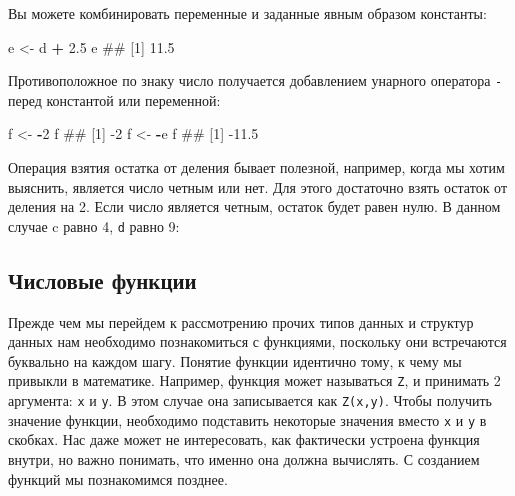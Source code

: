 \documentclass[]{book}
\newenvironment{Shaded}{\begin{snugshade}}{\end{snugshade}}
\newcommand{\DecValTok}[1]{\textcolor[rgb]{0.00,0.00,0.81}{#1}}
\newcommand{\FloatTok}[1]{\textcolor[rgb]{0.00,0.00,0.81}{#1}}
\newcommand{\StringTok}[1]{\textcolor[rgb]{0.31,0.60,0.02}{#1}}
\newcommand{\OperatorTok}[1]{\textcolor[rgb]{0.81,0.36,0.00}{\textbf{#1}}}
\newcommand{\NormalTok}[1]{#1}
\begin{document}
Вы можете комбинировать переменные и заданные явным образом константы:

\begin{Shaded}
\begin{Highlighting}[]
\NormalTok{e <-}\StringTok{ }\NormalTok{d }\OperatorTok{+}\StringTok{ }\FloatTok{2.5}
\NormalTok{e}
\NormalTok{## [1] 11.5}
\end{Highlighting}
\end{Shaded}

Противоположное по знаку число получается добавлением унарного оператора
\texttt{-} перед константой или переменной:

\begin{Shaded}
\begin{Highlighting}[]
\NormalTok{f <-}\StringTok{ }\OperatorTok{-}\DecValTok{2}
\NormalTok{f}
\NormalTok{## [1] -2}
\NormalTok{f <-}\StringTok{ }\OperatorTok{-}\NormalTok{e}
\NormalTok{f}
\NormalTok{## [1] -11.5}
\end{Highlighting}
\end{Shaded}

Операция взятия остатка от деления бывает полезной, например, когда мы
хотим выяснить, является число четным или нет. Для этого достаточно
взять остаток от деления на 2. Если число является четным, остаток будет
равен нулю. В данном случае c равно 4, \texttt{d} равно 9:

\begin{Shaded}
\end{Shaded}

\subsection{Числовые функции}\label{-}

Прежде чем мы перейдем к рассмотрению прочих типов данных и структур
данных нам необходимо познакомиться с функциями, поскольку они
встречаются буквально на каждом шагу. Понятие функции идентично тому, к
чему мы привыкли в математике. Например, функция может называться
\texttt{Z}, и принимать 2 аргумента: \texttt{x} и \texttt{y}. В этом
случае она записывается как \texttt{Z(x,y)}. Чтобы получить значение
функции, необходимо подставить некоторые значения вместо \texttt{x} и
\texttt{y} в скобках. Нас даже может не интересовать, как фактически
устроена функция внутри, но важно понимать, что именно она должна
вычислять. С созданием функций мы познакомимся позднее.
\end{document}
